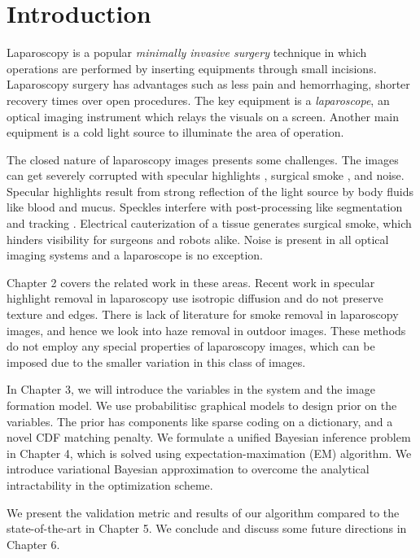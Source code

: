 
\newcommand{\etas}{\ensuremath{\eta_{\mathrm{s}}}}


\chapter{Introduction}

Laparoscopy is a popular \emph{minimally invasive surgery} technique in which operations are performed by inserting equipments through small incisions. Laparoscopy surgery has advantages such as less pain and hemorrhaging, shorter recovery times over open procedures. The key equipment is a \emph{laparoscope}, an optical imaging instrument which relays the visuals on a screen. Another main equipment is a cold light source to illuminate the area of operation.

The closed nature of laparoscopy images presents some challenges. The images can get severely corrupted with specular highlights \cite{stoyanov2005removing, saint2011detection}, surgical smoke \cite{barrett2003surgical}, and noise. Specular highlights result from strong reflection of the light source by body fluids like blood and mucus. Speckles interfere with post-processing like segmentation \cite{prokopetc2015segmentation, voros2007segmentation} and tracking \cite{wolf2011tracking}. Electrical cauterization of a tissue generates surgical smoke, which hinders visibility for surgeons and robots alike. Noise is present in all optical imaging systems and a laparoscope is no exception.

Chapter 2 covers the related work in these areas. Recent work in specular highlight removal in laparoscopy use isotropic diffusion and do not preserve texture and edges. There is lack of literature for smoke removal in laparoscopy images, and hence we look into haze removal in outdoor images. These methods do not employ any special properties of laparoscopy images, which can be imposed due to the smaller variation in this class of images.

In Chapter 3, we will introduce the variables in the system and the image formation model. We use probabilitisc graphical models to design prior on the variables. The prior has components like sparse coding on a dictionary, and a novel CDF matching penalty. We formulate a unified Bayesian inference problem in Chapter 4, which is solved using expectation-maximation (EM) algorithm. We introduce variational Bayesian approximation to overcome the analytical intractability in the optimization scheme. 

We present the validation metric and results of our algorithm compared to the state-of-the-art in Chapter 5. We conclude and discuss some future directions in Chapter 6.







